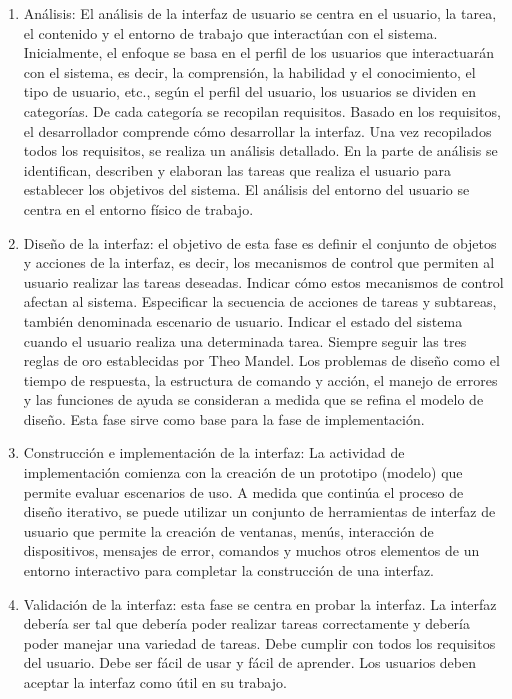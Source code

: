 \begin{enumerate}
\item Análisis: El análisis de la interfaz de usuario se centra en el usuario, la tarea, el contenido y el entorno de trabajo que interactúan con el sistema. Inicialmente, el enfoque se basa en el perfil de los usuarios que interactuarán con el sistema, es decir, la comprensión, la habilidad y el conocimiento, el tipo de usuario, etc., según el perfil del usuario, los usuarios se dividen en categorías. De cada categoría se recopilan requisitos. Basado en los requisitos, el desarrollador comprende cómo desarrollar la interfaz. Una vez recopilados todos los requisitos, se realiza un análisis detallado. En la parte de análisis se identifican, describen y elaboran las tareas que realiza el usuario para establecer los objetivos del sistema. El análisis del entorno del usuario se centra en el entorno físico de trabajo.
\item Diseño de la interfaz: el objetivo de esta fase es definir el conjunto de objetos y acciones de la interfaz, es decir, los mecanismos de control que permiten al usuario realizar las tareas deseadas. Indicar cómo estos mecanismos de control afectan al sistema. Especificar la secuencia de acciones de tareas y subtareas, también denominada escenario de usuario. Indicar el estado del sistema cuando el usuario realiza una determinada tarea. Siempre seguir las tres reglas de oro establecidas por Theo Mandel. Los problemas de diseño como el tiempo de respuesta, la estructura de comando y acción, el manejo de errores y las funciones de ayuda se consideran a medida que se refina el modelo de diseño. Esta fase sirve como base para la fase de implementación.
\item Construcción e implementación de la interfaz: La actividad de implementación comienza con la creación de un prototipo (modelo) que permite evaluar escenarios de uso. A medida que continúa el proceso de diseño iterativo, se puede utilizar un conjunto de herramientas de interfaz de usuario que permite la creación de ventanas, menús, interacción de dispositivos, mensajes de error, comandos y muchos otros elementos de un entorno interactivo para completar la construcción de una interfaz.
\item Validación de la interfaz: esta fase se centra en probar la interfaz. La interfaz debería ser tal que debería poder realizar tareas correctamente y debería poder manejar una variedad de tareas. Debe cumplir con todos los requisitos del usuario. Debe ser fácil de usar y fácil de aprender. Los usuarios deben aceptar la interfaz como útil en su trabajo.
\end{enumerate}

